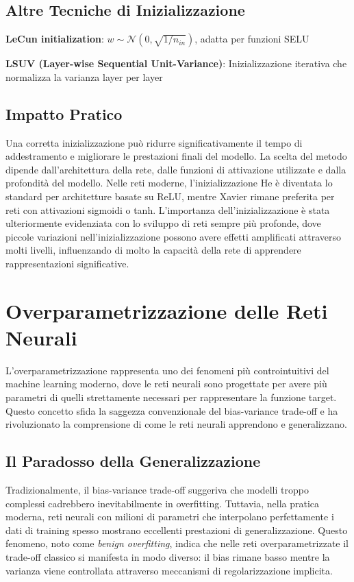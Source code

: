 \subsection{Altre Tecniche di Inizializzazione}
\begin{compactitemize}
\item \textbf{LeCun initialization}: $w \sim \mathcal{N}(0, \sqrt{1/n_{in}})$, adatta per funzioni SELU
\item \textbf{LSUV (Layer-wise Sequential Unit-Variance)}: Inizializzazione iterativa che normalizza la varianza layer per layer
\end{compactitemize}

\subsection{Impatto Pratico}
Una corretta inizializzazione può ridurre significativamente il tempo di addestramento e migliorare le prestazioni finali del modello. La scelta del metodo dipende dall'architettura della rete, dalle funzioni di attivazione utilizzate e dalla profondità del modello. Nelle reti moderne, l'inizializzazione He è diventata lo standard per architetture basate su ReLU, mentre Xavier rimane preferita per reti con attivazioni sigmoidi o tanh.
L'importanza dell'inizializzazione è stata ulteriormente evidenziata con lo sviluppo di reti sempre più profonde, dove piccole variazioni nell'inizializzazione possono avere effetti amplificati attraverso molti livelli, influenzando di molto la capacità della rete di apprendere rappresentazioni significative.



\section{Overparametrizzazione delle Reti Neurali}
L'overparametrizzazione rappresenta uno dei fenomeni più controintuitivi del machine learning moderno, dove le reti neurali sono progettate per avere più parametri di quelli strettamente necessari per rappresentare la funzione target. Questo concetto sfida la saggezza convenzionale del bias-variance trade-off e ha rivoluzionato la comprensione di come le reti neurali apprendono e generalizzano.

\subsection{Il Paradosso della Generalizzazione}
Tradizionalmente, il bias-variance trade-off suggeriva che modelli troppo complessi cadrebbero inevitabilmente in overfitting. Tuttavia, nella pratica moderna, reti neurali con milioni di parametri che interpolano perfettamente i dati di training spesso mostrano eccellenti prestazioni di generalizzazione. Questo fenomeno, noto come \textit{benign overfitting}, indica che nelle reti overparametrizzate il trade-off classico si manifesta in modo diverso: il bias rimane basso mentre la varianza viene controllata attraverso meccanismi di regolarizzazione implicita.

